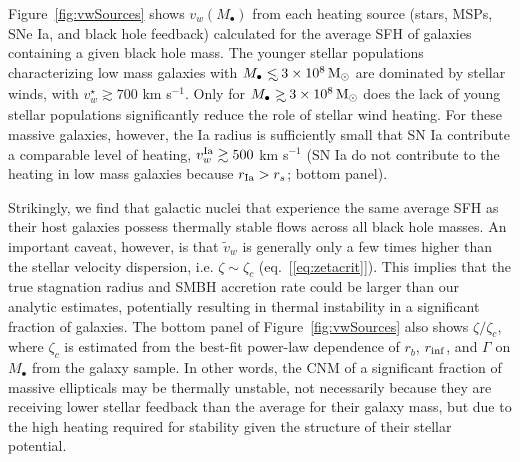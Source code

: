 \documentclass[usenatbib,fleqn]{mn2e}
\newcommand\lsim{\mathrel{\rlap{\lower4pt\hbox{\hskip1pt$\sim$}}
    \raise1pt\hbox{$<$}}}
\newcommand\gsim{\mathrel{\rlap{\lower4pt\hbox{\hskip1pt$\sim$}}
    \raise1pt\hbox{$>$}}}
\newcommand{\rs}{r_s}
\newcommand{\vw}{\tilde{v}_{w}}
\newcommand{\Mbh}[1][]{M_{\bullet#1}}
\newcommand{\rinf}{r_{\rm inf}}
\newcommand{\vwO}{v_{w}}
\begin{document}
Figure~\ref{fig:vwSources} shows $\vwO(M_{\bullet})$ from each heating
source (stars, MSPs, SNe Ia, and black hole feedback) calculated for
the average SFH of galaxies containing a given black hole mass.  The
younger stellar populations characterizing low mass galaxies with $\Mbh\lsim
3\times 10^{8} \Msun$ are dominated by stellar winds, with
$v_{w}^{\star} \gtrsim 700$ km s$^{-1}$.  Only for $\Mbh\gsim 3\times
10^{8} \Msun$ does the lack of young stellar populations significantly
reduce the role of stellar wind heating.  For these massive
galaxies, however, the Ia radius is sufficiently small that SN Ia contribute
a comparable level of heating, $v_{w}^{\rm Ia} \gtrsim 500$ km
s$^{-1}$ (SN Ia do not contribute to the heating in low mass galaxies because $r_{\rm Ia} > \rs$; bottom panel).  

Strikingly, we find that galactic nuclei that experience the same average SFH as
their host galaxies possess thermally stable flows across all
black hole masses.  An important caveat, however, is that $\vw$ is generally only a few times higher than the stellar velocity dispersion, i.e. $\zeta \sim \zeta_c$
(eq.~[\ref{eq:zetacrit}]).  This implies that the true stagnation radius and SMBH accretion rate could be larger than our analytic estimates, potentially resulting in thermal instability in a significant fraction of galaxies.  The bottom panel of Figure~\ref{fig:vwSources} also shows $\zeta/\zeta_c$, where $\zeta_c$ is estimated from the best-fit power-law dependence of $r_b$, $\rinf$, and $\Gamma$ on $M_{\bullet}$ from the \citet{LauerFaber+:2007a} galaxy sample.   In other words, the CNM of a significant fraction of massive ellipticals may be thermally unstable, not necessarily because they are receiving lower stellar feedback than the average for their galaxy mass, but due to the high heating required for stability given the structure of their stellar potential.
\end{document}
